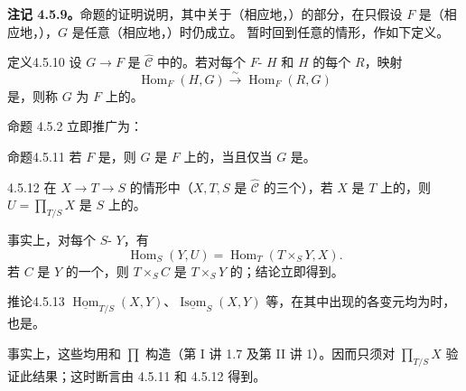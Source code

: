 \textbf{注记 4.5.9。}命题的证明说明，其中关于（相应地，）的部分，在只假设 $F$ 是（相应地，），$G$ 是任意（相应地，）时仍成立。
暂时回到任意的情形，作如下定义。
\begin{SGAresult}{定义}{4.5.10}
设 $G\to F$ 是 $\widehat{\mathcal C}$ 中的。若对每个 $F$- $H$ 和 $H$ 的每个 $R$，映射
\[
\operatorname{Hom}_F(H,G)\xrightarrow{\sim}\operatorname{Hom}_F(R,G)\tag{+}
\]
是，则称 $G$ 为 $F$ 上的。
\end{SGAresult}
命题 4.5.2 立即推广为：
\begin{SGAresult}{命题}{4.5.11}
若 $F$ 是，则 $G$ 是 $F$ 上的，当且仅当 $G$ 是。
\end{SGAresult}
\begin{SGAresult}{}{4.5.12}
在 $X\to T\to S$ 的情形中（$X,T,S$ 是 $\widehat{\mathcal C}$ 的三个），若 $X$ 是 $T$ 上的，则 $U=\prod_{T/S}X$ 是 $S$ 上的。
\end{SGAresult}
事实上，对每个 $S$- $Y$，有
\[
\operatorname{Hom}_S(Y,U)=\operatorname{Hom}_T(T\times_S Y,X).
\]
若 $C$ 是 $Y$ 的一个，则 $T\times_S C$ 是 $T\times_S Y$ 的；结论立即得到。
\begin{SGAresult}{推论}{4.5.13}
 $\underline{\operatorname{Hom}}_{T/S}(X,Y)$、$\underline{\operatorname{Isom}}_S(X,Y)$ 等，在其中出现的各变元均为时，也是。
\end{SGAresult}
事实上，这些均用和 $\prod$ 构造（第 I 讲 1.7 及第 II 讲 1）。因而只须对 $\prod_{T/S}X$ 验证此结果；这时断言由 4.5.11 和 4.5.12 得到。


